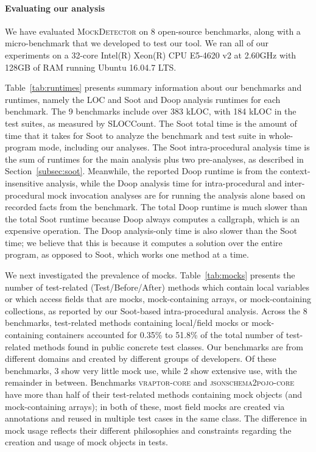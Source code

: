 \paragraph{Evaluating our analysis} We have evaluated \textsc{MockDetector} on 8 open-source benchmarks, along with a micro-benchmark that we developed to test our tool. We ran all of our experiments on a 32-core Intel(R) Xeon(R) CPU E5-4620 v2 at 2.60GHz with 128GB of RAM running Ubuntu 16.04.7 LTS.

Table~\ref{tab:runtimes} presents summary information about our benchmarks and runtimes, namely the LOC and Soot and Doop analysis runtimes for each benchmark. The 9 benchmarks include over 383 kLOC, with 184 kLOC in the test suites, as measured by SLOCCount. The Soot total time is the amount of time that it takes for Soot to analyze the benchmark and test suite in whole-program mode, including our analyses. The Soot intra-procedural analysis time is the sum of runtimes for the main analysis plus two pre-analyses, as described in Section~\ref{subsec:soot}. Meanwhile, the reported Doop runtime is from the context-insensitive analysis, while the Doop analysis time for intra-procedural and inter-procedural mock invocation analyses are for running the analysis alone based on recorded facts from the benchmark. The total Doop runtime is much slower than the total Soot runtime because Doop always computes a callgraph, which is an expensive operation. The Doop analysis-only time is also slower than the Soot time; we believe that this is because it computes a solution over the entire program, as opposed to Soot, which works one method at a time.

We next investigated the prevalence of mocks. Table~\ref{tab:mocks} presents the number of test-related (Test/Before/After) methods which contain local variables or which access fields that are mocks, mock-containing arrays, or mock-containing collections, as reported by our Soot-based intra-procedural analysis. Across the 8 benchmarks, test-related methods containing local/field mocks or mock-containing containers accounted for 0.35\% to 51.8\% of the total number of test-related methods found in public concrete test classes.  Our benchmarks are from different domains and created by different groups of developers. Of these benchmarks, 3 show very little mock use, while 2 show extensive use, with the remainder in between. Benchmarks \textsc{vraptor-core} and \textsc{jsonschema2pojo-core} have more than half of their test-related methods containing mock objects (and mock-containing arrays); in both of these, most field mocks are created via annotations and reused in multiple test cases in the same class. The difference in mock usage reflects their different philosophies and constraints regarding the creation and usage of mock objects in tests.

